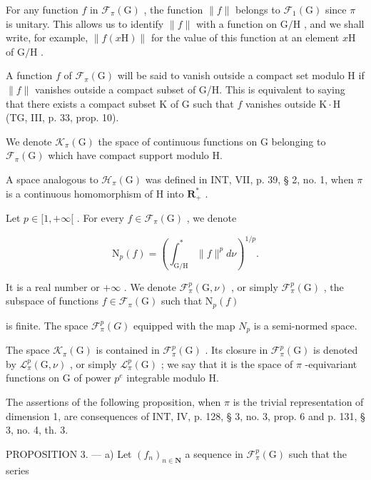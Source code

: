 For any function \(f\) in \(\mathcal{F}_{\pi}(\mathrm{G})\) , the function \(\|f\|\) belongs to \(\mathcal{F}_{1}(\mathrm{G})\) since \(\pi\) is unitary. This allows us to identify \(\|f\|\) with a function on \(\mathrm{G/H}\) , and we shall write, for example, \(\|f(x\mathrm{H})\|\) for the value of this function at an element \(x\mathrm{H}\) of \(\mathrm{G/H}\) .

A function \(f\) of \(\mathcal{F}_{\pi}(\mathrm{G})\) will be said to vanish outside a compact set modulo H if \(\|f\|\) vanishes outside a compact subset of G/H. This is equivalent to saying that there exists a compact subset K of G such that \(f\) vanishes outside \(\mathrm{K} \cdot \mathrm{H}\) (TG, III, p. 33, prop. 10).

We denote \(\mathcal{K}_{\pi}(\mathrm{G})\) the space of continuous functions on G belonging to \(\mathcal{F}_{\pi}(\mathrm{G})\) which have compact support modulo H.

A space analogous to \(\mathcal{H}_{\pi}(\mathrm{G})\) was defined in INT, VII, p. 39, § 2, no. 1, when \(\pi\) is a continuous homomorphism of H into \(\mathbf{R}_{+}^{*}\) .

Let \(p \in [1, +\infty[\) . For every \(f \in \mathcal{F}_{\pi}(\mathrm{G})\) , we denote

\[
\mathrm{N} _ {p} (f) = \left(\int_ {\mathrm{G/H}} ^ {*} \| f \| ^ {p} d \nu\right) ^ {1 / p}.
\]

It is a real number or \(+\infty\) . We denote \(\mathcal{F}_{\pi}^{p}(\mathrm{G},\nu)\) , or simply \(\mathcal{F}_{\pi}^{p}(\mathrm{G})\) , the subspace of functions \(f\in \mathcal{F}_{\pi}(\mathrm{G})\) such that \(\mathrm{N}_p(f)\)

is finite. The space \(\mathcal{F}_{\pi}^{p}(G)\) equipped with the map \(N_{p}\) is a semi-normed space.

The space \(\mathcal{K}_{\pi}(\mathrm{G})\) is contained in \(\mathcal{F}_{\pi}^{p}(\mathrm{G})\) . Its closure in \(\mathcal{F}_{\pi}^{p}(\mathrm{G})\) is denoted by \(\mathcal{L}_{\pi}^{p}(\mathrm{G},\nu)\) , or simply \(\mathcal{L}_{\pi}^{p}(\mathrm{G})\) ; we say that it is the space of \(\pi\) -equivariant functions on G of power \(p^{e}\) integrable modulo H.

The assertions of the following proposition, when \(\pi\) is the trivial representation of dimension 1, are consequences of INT, IV, p. 128, § 3, no. 3, prop. 6 and p. 131, § 3, no. 4, th. 3.

PROPOSITION 3. --- a) Let \((f_n)_{n \in \mathbf{N}}\) a sequence in \(\mathcal{F}_\pi^p(\mathrm{G})\) such that the series

